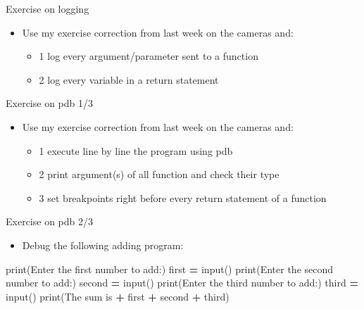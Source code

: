 \documentclass[
  8pt,
  ignorenonframetext,
]{beamer}
\newenvironment{Shaded}{\begin{snugshade}}{\end{snugshade}}
\newcommand{\BuiltInTok}[1]{#1}
\newcommand{\NormalTok}[1]{#1}
\newcommand{\OperatorTok}[1]{\textcolor[rgb]{0.81,0.36,0.00}{\textbf{#1}}}
\newcommand{\StringTok}[1]{\textcolor[rgb]{0.31,0.60,0.02}{#1}}
\providecommand{\tightlist}{%
  \setlength{\itemsep}{0pt}\setlength{\parskip}{0pt}}
\begin{document}
\begin{frame}{Exercise on logging}
\protect\hypertarget{exercise-on-logging}{}
\begin{itemize}
\tightlist
\item
  Use my exercise correction from last week on the cameras and:

  \begin{itemize}
  \tightlist
  \item
    1 log every argument/parameter sent to a function
  \item
    2 log every variable in a return statement
  \end{itemize}
\end{itemize}
\end{frame}

\begin{frame}{Exercise on pdb 1/3}
\protect\hypertarget{exercise-on-pdb-13}{}
\begin{itemize}
\tightlist
\item
  Use my exercise correction from last week on the cameras and:

  \begin{itemize}
  \tightlist
  \item
    1 execute line by line the program using pdb
  \item
    2 print argument(s) of all function and check their type
  \item
    3 set breakpoints right before every return statement of a function
  \end{itemize}
\end{itemize}
\end{frame}

\begin{frame}[fragile]{Exercise on pdb 2/3}
\protect\hypertarget{exercise-on-pdb-23}{}
\begin{itemize}
\tightlist
\item
  Debug the following adding program:
\end{itemize}

\begin{Shaded}
\begin{Highlighting}[]
\BuiltInTok{print}\NormalTok{(}\StringTok{\textquotesingle{}Enter the first number to add:\textquotesingle{}}\NormalTok{)}
\NormalTok{first }\OperatorTok{=} \BuiltInTok{input}\NormalTok{()}
\BuiltInTok{print}\NormalTok{(}\StringTok{\textquotesingle{}Enter the second number to add:\textquotesingle{}}\NormalTok{)}
\NormalTok{second }\OperatorTok{=} \BuiltInTok{input}\NormalTok{()}
\BuiltInTok{print}\NormalTok{(}\StringTok{\textquotesingle{}Enter the third number to add:\textquotesingle{}}\NormalTok{)}
\NormalTok{third }\OperatorTok{=} \BuiltInTok{input}\NormalTok{()}
\BuiltInTok{print}\NormalTok{(}\StringTok{\textquotesingle{}The sum is \textquotesingle{}} \OperatorTok{+}\NormalTok{ first }\OperatorTok{+}\NormalTok{ second }\OperatorTok{+}\NormalTok{ third)}
\end{Highlighting}
\end{Shaded}
\end{frame}
\end{document}
